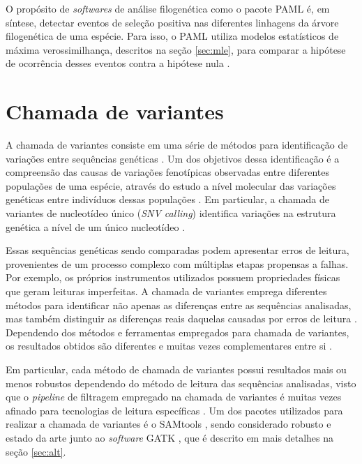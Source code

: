 \documentclass[cic,tc]{iiufrgs}
\begin{document}
O propósito de \textit{softwares} de análise filogenética como o pacote PAML é, em
síntese, detectar eventos de seleção positiva nas diferentes linhagens da
árvore filogenética de uma espécie. Para isso, o PAML utiliza modelos
estatísticos de máxima verossimilhança, descritos na seção \ref{sec:mle}, para
comparar a hipótese de ocorrência desses eventos contra a hipótese nula
\cite{moretti2012gcodeml}.

\section{Chamada de variantes}
\label{sec:call}

A chamada de variantes consiste em uma série de métodos para identificação de
variações entre sequências genéticas \cite{nielsen2011genotype}. Um dos
objetivos dessa identificação é a compreensão das causas de variações
fenotípicas observadas entre diferentes populações de uma espécie, através do
estudo a nível molecular das variações genéticas entre indivíduos dessas
populações \cite{jiang2019population}. Em particular, a chamada de variantes de
nucleotídeo único (\textit{SNV calling}) identifica variações na estrutura
genética a nível de um único nucleotídeo \cite{khurana2016role}.

Essas sequências genéticas sendo comparadas podem apresentar erros de leitura,
provenientes de um processo complexo com múltiplas etapas propensas a falhas.
Por exemplo, os próprios instrumentos utilizados possuem propriedades físicas
que geram leituras imperfeitas. A chamada de variantes emprega diferentes
métodos para identificar não apenas as diferenças entre as sequências
analisadas, mas também distinguir as diferenças reais daquelas causadas por
erros de leitura \cite{poplin2018universal}. Dependendo dos métodos e
ferramentas empregados para chamada de variantes, os resultados obtidos são
diferentes e muitas vezes complementares entre
si \cite{hwang2015systematic} \cite{gezsi2015variantmetacaller} \cite{guo2015seqmule}.

Em particular, cada método de chamada de variantes possui resultados mais ou
menos robustos dependendo do método de leitura das sequências analisadas, visto
que o \textit{pipeline} de filtragem empregado na chamada de variantes é muitas vezes
afinado para tecnologias de leitura específicas \cite{poplin2018universal}. Um
dos pacotes utilizados para realizar a chamada de variantes é o
SAMtools \cite{pirooznia2014validation}, sendo considerado robusto e estado da
arte junto ao \textit{software}
GATK \cite{crysnanto2019accurate} \cite{hwang2015systematic}
\cite{yao2020evaluation} \cite{poplin2018universal}, que é descrito em mais
detalhes na seção \ref{sec:alt}.
\end{document}

